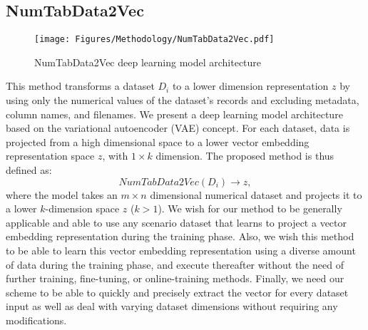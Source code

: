 
\subsection{NumTabData2Vec}
\begin{figure}[!ht]
    \centering
    \captionsetup{justification=centering}
    \texttt{[image: Figures/Methodology/NumTabData2Vec.pdf]}
    \caption{NumTabData2Vec deep learning model architecture}
    \label{fig:fig-method2}
\end{figure}

This method transforms a dataset $D_i$ to a lower dimension representation $z$ by using only the numerical values of the dataset's records and excluding metadata, column names, and filenames. We present a deep learning model architecture based on the variational autoencoder (VAE) \cite{b1VAE} concept. For each dataset, data is projected from a high dimensional space to a lower vector embedding representation space $z$, with $1\times k$ dimension. The proposed method is thus defined as: 
\begin{equation}
    NumTabData2Vec\left( D_i \right) \rightarrow z, \label{eq_3_method}
\end{equation}
where the model takes an $m\times n$ dimensional numerical dataset and projects it to a lower $k$-dimension space $z$ ($k > 1$). We wish for our method 
to be generally applicable and able to use any scenario dataset that learns to project a vector embedding representation during the training phase. Also, we wish this method to be able to learn this vector embedding representation using a diverse amount of data during the training phase, and execute thereafter without the need of further training, fine-tuning, or online-training methods. Finally, we need our scheme to be able to quickly and precisely extract the vector for every dataset input as well as deal with varying dataset dimensions without requiring any modifications. 

